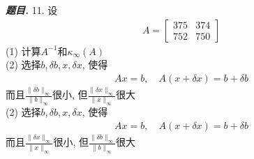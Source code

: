 \documentclass[10pt, a4paper, oneside]{ctexart}
\newcommand{\norm}[1]{\| #1 \|}
\newenvironment{problem}{\begin{framed}\par\noindent\textbf{\textit{题目. }}}{\end{framed}\par}
\begin{document}
\begin{problem}
11. 设 
\begin{align*}
    A=\begin{bmatrix}
        375&374\\752&750
    \end{bmatrix}
\end{align*}
(1) 计算$A^{-1}$和$\kappa_{\infty}(A)$\\
(2) 选择$b,\delta b, x, \delta x$, 使得
\begin{align*}
    Ax=b, \quad A(x+\delta x)=b+\delta b
\end{align*}
而且$\frac{\norm{\delta b}_{\infty}}{\norm{ b}_{\infty}}$很小, 但$\frac{\norm{\delta x}_{\infty}}{\norm{x}_{\infty}}$很大\\
(2) 选择$b,\delta b, x, \delta x$, 使得
\begin{align*}
    Ax=b, \quad A(x+\delta x)=b+\delta b
\end{align*}
而且$\frac{\norm{\delta x}_{\infty}}{\norm{ x}_{\infty}}$很小, 但$\frac{\norm{\delta b}_{\infty}}{\norm{b}_{\infty}}$很大
\end{problem}
\end{document}

